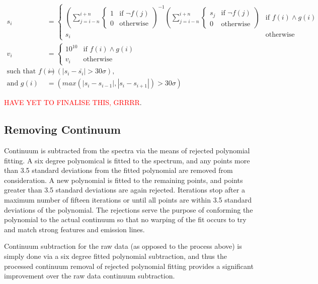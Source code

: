 \documentclass[titlesmallcaps, examinerscopy, copyrightpage]{uqthesis}
\newcommand{\brac}[1]{\left( #1 \right)}
\newcommand*\mean[1]{\bar{#1}}
\newcommand\abs[1]{\left|#1\right|}
\begin{document}
\begin{align}
s_i &= 
\begin{cases}
	\brac{\sum\limits_{j=i-n}^{i+n} \begin{cases}1 & \text{if } \lnot f(j) \\ 0 & \text{otherwise} \end{cases}}^{-1}\brac{\sum\limits_{j=i-n}^{i+n} \begin{cases}s_j & \text{if } \lnot f(j) \\ 0 & \text{otherwise} \end{cases}} & \text{if } f(i)\land g(i) \\
	s_i & \text{otherwise}
\end{cases}\\
v_i &= 
\begin{cases}
	10^{10} & \text{if } f(i)\land g(i) \\
	v_i & \text{otherwise}
\end{cases}\\
\text{such that } f(i) &= \brac{\abs{s_i - \mean{s_i}} > 30 \sigma}, \\
\text{and } g(i) &= \brac{max\brac{\abs{s_i - s_{i-1}}, \abs{s_i - s_{i+1}}} > 30 \sigma}
\end{align} 


\textcolor{red}{HAVE YET TO FINALISE THIS, GRRRR}.


\subsection{Removing Continuum} \label{sec:continuum}

Continuum is subtracted from the spectra via the means of rejected polynomial fitting. A six degree polynomical is fitted to the spectrum, and any points more than 3.5 standard deviations from the fitted polynomial are removed from consideration. A new polynomial is fitted to the remaining points, and points greater than 3.5 standard deviations are again rejected. Iterations stop after a maximum number of fifteen iterations or until all points are within 3.5 standard deviations of the polynomial. The rejections serve the purpose of conforming the polynomial to the actual continuum so that no warping of the fit occurs to try and match strong features and emission lines.

Continuum subtraction for the raw data (as opposed to the process above) is simply done via a six degree fitted polynomial subtraction, and thus the processed continuum removal of rejected polynomial fitting provides a significant improvement over the raw data continuum subtraction.
\end{document}
